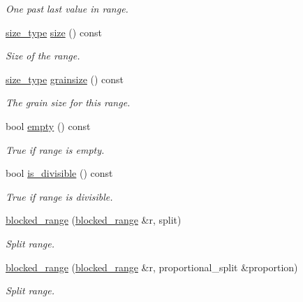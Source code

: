 \begin{DoxyCompactItemize}
\begin{DoxyCompactList}\small\item\em One past last value in range. \end{DoxyCompactList}\item 
\hyperlink{classtbb_1_1blocked__range_a89b300cecd9d617e4ee801c786756e55}{size\+\_\+type} \hyperlink{classtbb_1_1blocked__range_a347ef8caa40edca3b7f475f182281140}{size} () const 
\begin{DoxyCompactList}\small\item\em Size of the range. \end{DoxyCompactList}\item 
\hypertarget{classtbb_1_1blocked__range_ab408f3cf90c85fa9203df5641a2f9bb1}{}\hyperlink{classtbb_1_1blocked__range_a89b300cecd9d617e4ee801c786756e55}{size\+\_\+type} \hyperlink{classtbb_1_1blocked__range_ab408f3cf90c85fa9203df5641a2f9bb1}{grainsize} () const \label{classtbb_1_1blocked__range_ab408f3cf90c85fa9203df5641a2f9bb1}

\begin{DoxyCompactList}\small\item\em The grain size for this range. \end{DoxyCompactList}\item 
\hypertarget{classtbb_1_1blocked__range_a59dec03416b3fefbf69600f798177710}{}bool \hyperlink{classtbb_1_1blocked__range_a59dec03416b3fefbf69600f798177710}{empty} () const \label{classtbb_1_1blocked__range_a59dec03416b3fefbf69600f798177710}

\begin{DoxyCompactList}\small\item\em True if range is empty. \end{DoxyCompactList}\item 
bool \hyperlink{classtbb_1_1blocked__range_ad90ad1db0d4d9a301ef1c9e17712e8a0}{is\+\_\+divisible} () const 
\begin{DoxyCompactList}\small\item\em True if range is divisible. \end{DoxyCompactList}\item 
\hyperlink{classtbb_1_1blocked__range_a75cae12286f4d5492970ea630a9783b9}{blocked\+\_\+range} (\hyperlink{classtbb_1_1blocked__range}{blocked\+\_\+range} \&r, split)
\begin{DoxyCompactList}\small\item\em Split range. \end{DoxyCompactList}\item 
\hyperlink{classtbb_1_1blocked__range_a1f53fbb10b8b04a515f382704b00ed14}{blocked\+\_\+range} (\hyperlink{classtbb_1_1blocked__range}{blocked\+\_\+range} \&r, proportional\+\_\+split \&proportion)
\begin{DoxyCompactList}\small\item\em Split range. \end{DoxyCompactList}\end{DoxyCompactItemize}
